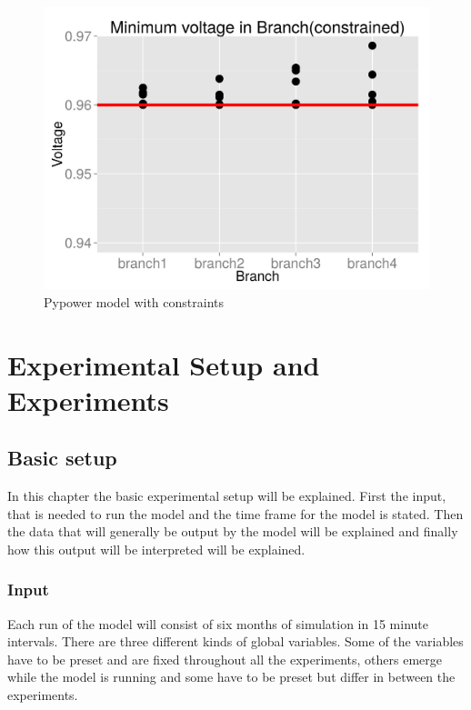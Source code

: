 \documentclass[a4paper]{article}
\begin{document}
\begin{figure}[!ht]
\includegraphics[width =\textwidth]{constrained.jpg}
\caption{Pypower model with constraints}
\label{constrained_pypower}
\end{figure}
\clearpage

\section{Experimental Setup and Experiments}
\subsection{Basic setup}
In this chapter the basic experimental setup will be explained. First the input, that is needed to run the model 
and the time frame for the model is stated. Then the data that will generally be output by the model will be explained 
and finally how this output will be interpreted will be explained. 
\subsubsection{Input}
Each run of the model will consist of six months of simulation in 15 minute intervals. There are three different kinds of 
global variables. 
Some of the variables have to be preset and are fixed throughout all the experiments, others emerge while the 
model is running and some have to be preset but differ in between the experiments.
\end{document}
